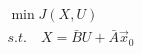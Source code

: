 \documentclass{article}
\begin{document}
\thispagestyle{empty}

$$
\begin{array}{l}
\min J(X,U)\\
s.t.\quad X=\bar{B}U + \bar{A}\vec{x}_0
\end{array}
$$
\end{document}
